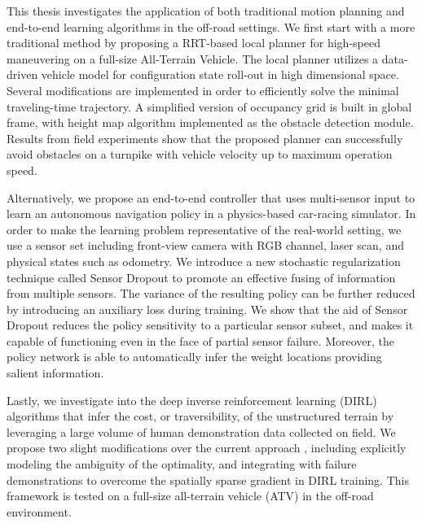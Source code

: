 \documentclass[../thesis.tex]{subfiles}
\begin{document}

This thesis investigates the application of both traditional motion planning and end-to-end learning algorithms in the off-road settings.
We first start with a more traditional method by proposing a RRT-based local planner for high-speed maneuvering on a full-size All-Terrain Vehicle. 
The local planner utilizes a data-driven vehicle model for configuration state roll-out in high dimensional space. 
Several modifications are implemented in order to efficiently solve the minimal traveling-time trajectory.
A simplified version of occupancy grid is built in global frame, with height map algorithm implemented as the obstacle detection module.
Results from field experiments show that the proposed planner can successfully avoid obstacles on a turnpike with vehicle velocity up to maximum operation speed.

Alternatively, we propose an end-to-end controller that uses multi-sensor input to learn an autonomous navigation policy in a physics-based car-racing simulator.
In order to make the learning problem representative of the real-world setting, we use a sensor set including front-view camera with RGB channel, laser scan, and physical states such as odometry. 
We introduce a new stochastic regularization technique called Sensor Dropout to promote an effective fusing of information from multiple sensors. 
The variance of the resulting policy can be further reduced by introducing an auxiliary loss during training. 
We show that the aid of Sensor Dropout reduces the policy sensitivity to a particular sensor subset, and makes it capable of functioning even in the face of partial sensor failure. 
Moreover, the policy network is able to automatically infer the weight locations providing salient information. 

Lastly, we investigate into the deep inverse reinforcement learning (DIRL) algorithms that infer the cost, or traversibility, of the unstructured terrain by leveraging a large volume of human demonstration data collected on field. 
We propose two slight modifications over the current approach \cite{wulfmeier2015maximum}, including explicitly modeling the ambiguity of the optimality, and integrating with failure demonstrations to overcome the spatially sparse gradient in DIRL training.
This framework is tested on a full-size all-terrain vehicle (ATV) in the off-road environment.
\end{document}
